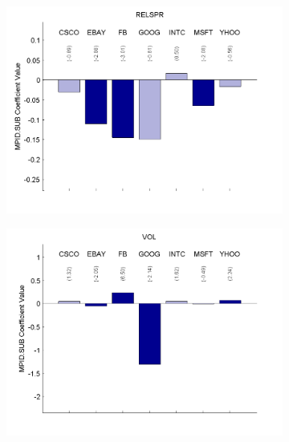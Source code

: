 \documentclass{article}
\begin{document}
\begin{figure}[htp!]
\caption{Coefficients from Firm-Level Post Regressions: TMBR} \label{indreg3}

\begin{subfigure}{0.31\textwidth}
\includegraphics[width=\linewidth]{docs/TMBR_Regression_Ratio_30sec_1_MPID_SUB_1MPIDLags_5DepVarLags.pdf}
\end{subfigure}
\hspace*{\fill}
\begin{subfigure}{0.31\textwidth}
\includegraphics[width=\linewidth]{docs/TMBR_Regression_Ratio_30sec_6_MPID_SUB_1MPIDLags_5DepVarLags.pdf}

\end{subfigure}
\end{figure}
\end{document}
